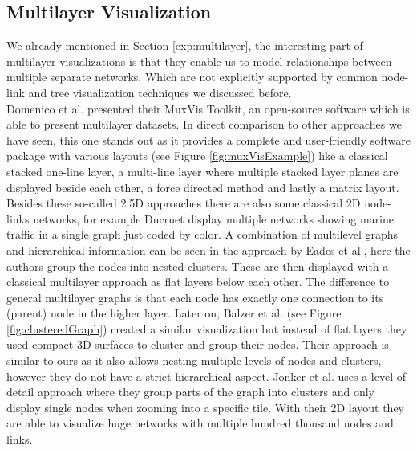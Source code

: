 \subsection{Multilayer Visualization}
We already mentioned in Section \ref{exp:multilayer}, the interesting part of multilayer visualizations is that they enable us to model relationships between multiple separate networks. Which are not explicitly supported by common node-link and tree visualization techniques we discussed before.\\
Domenico et al. \cite{de_domenico_muxviz_2015} presented their MuxVis Toolkit, an open-source software which is able to present multilayer datasets. In direct comparison to other approaches we have seen, this one stands out as it provides a complete and user-friendly software package with various layouts (see Figure \ref{fig:muxVisExample}) like a classical stacked one-line layer, a multi-line layer where multiple stacked layer planes are displayed beside each other, a force directed method and lastly a matrix layout. Besides these so-called 2.5D approaches there are also some classical 2D node-links networks, for example Ducruet \cite{ducruet_multilayer_nodate} display multiple networks showing marine traffic in a single graph just coded by color. 
A combination of multilevel graphs and hierarchical information can be seen in the approach by Eades \cite{eades_multilevel_1997} et al., here the authors group the nodes into nested clusters. These are then displayed with a classical multilayer approach as flat layers below each other. The difference to general multilayer graphs is that each node has exactly one connection to its (parent) node in the higher layer. 
Later on, Balzer et al. \cite{balzer_level--detail_2007} (see Figure \ref{fig:clusteredGraph}) created a similar visualization but instead of flat layers they used compact 3D surfaces to cluster and group their nodes. Their approach is similar to ours as it also allows nesting multiple levels of nodes and clusters, however they do not have a strict hierarchical aspect. 
Jonker et al. \cite{jonker_graph_2017} uses a level of detail approach where they group parts of the graph into clusters and only display single nodes when zooming into a specific tile. With their 2D layout they are able to visualize huge networks with multiple hundred thousand nodes and links. 

